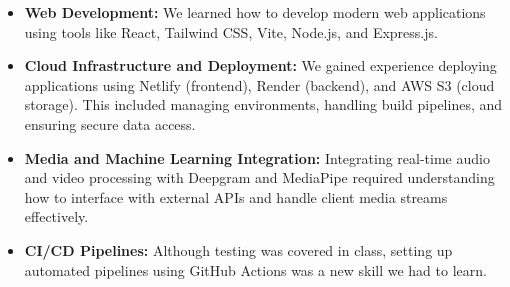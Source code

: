 \documentclass{article}
\begin{document}
\begin{itemize}
    \item \textbf{Web Development:} We learned how to develop modern web applications using tools like React, Tailwind CSS, Vite, Node.js, and Express.js.
    
    \item \textbf{Cloud Infrastructure and Deployment:} We gained experience deploying applications using Netlify (frontend), Render (backend), and AWS S3 (cloud storage). 
    This included managing environments, handling build pipelines, and ensuring secure data access.
    
    \item \textbf{Media and Machine Learning Integration:} Integrating real-time audio and video processing with Deepgram and MediaPipe required understanding how to interface with external APIs and handle client media streams effectively.
    
    \item \textbf{CI/CD Pipelines:} Although testing was covered in class, setting up automated pipelines using GitHub Actions was a new skill we had to learn.
\end{itemize}
\end{document}
